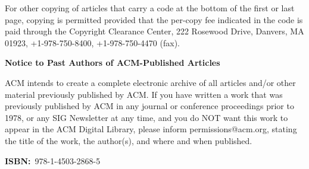 \documentclass[10pt]{book}
\begin{document}
\noindent For other copying of articles that carry a code at the bottom of the first or
last page, copying is permitted provided that the per-copy fee indicated in
the code is paid through the Copyright Clearance Center, 222 Rosewood Drive,
Danvers, MA 01923, +1-978-750-8400, +1-978-750-4470 (fax).

\vspace{.4cm}

\noindent \textbf{Notice to Past Authors of ACM-Published Articles}

\noindent ACM intends to create a complete electronic archive of all articles and/or
other material previously published by ACM. If you have written a work that
was previously published by ACM in any journal or conference proceedings prior
to 1978, or any SIG Newsletter at any time, and you do NOT want this work to
appear in the ACM Digital Library, please inform permissions@acm.org, stating
the title of the work, the author(s), and where and when published.

\vspace{.4cm}

\noindent \large \textbf{ISBN:}~978-1-4503-2868-5
\end{document}
